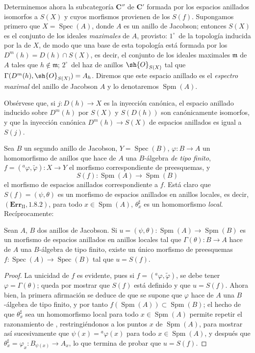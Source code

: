 \begin{env}[10.9.3]
\label{IV.10.9.3}
Determinemos ahora la subcategoría $\boldsymbol{C}''$ de $\boldsymbol{C}'$ formada por los espacios anillados isomorfos a $S(X)$ y cuyos morfismos provienen de los $S(f)$.
Supongamos primero que $X=\operatorname{Spec}(A)$, donde $A$ es un anillo de Jacobson; entonces $S(X)$ es el conjunto de los ideales \emph{maximales} de $A$, provisto: $1^\circ$~de la topología inducida por la de $X$, de modo que una base de esta topología está formada por los $D^m(h)=D(h)\cap S(X)$, es decir, el conjunto de los ideales maximales $\mathfrak{m}$ de $A$ tales que $h\notin\mathfrak{m}$; $2^\circ$~del haz de anillos $\sh{O}_{S(X)}$ tal que $\Gamma(D^m(h),\sh{O}_{S(X)})=A_h$.
Diremos que este espacio anillado es el \emph{espectro maximal} del anillo de Jacobson $A$ y lo denotaremos $\operatorname{Spm}(A)$.

Obsérvese que, si $j:D(h)\to X$ es la inyección canónica, el espacio anillado inducido sobre $D^m(h)$ por $S(X)$ y $S(D(h))$ son canónicamente isomorfos, y que la inyección canónica $D^m(h)\to S(X)$ de espacios anillados es igual a $S(j)$.

Sea $B$ un segundo anillo de Jacobson, $Y=\operatorname{Spec}(B)$, $\varphi:B\to A$ un homomorfismo de anillos que hace de $A$ una $B$-álgebra \emph{de tipo finito}, $f=({}^a\varphi,\widetilde{\varphi}):X\to Y$ el morfismo correspondiente de preesquemas, y
\[
  S(f):\operatorname{Spm}(A)\to\operatorname{Spm}(B)
\]
el morfismo de espacios anillados correspondiente a $f$.
Está claro que $S(f)=(\psi,\theta)$ es un morfismo de espacios anillados en anillos locales, es decir, $(\mathbf{Err}_{\mathrm{II}},1.8.2)$, para todo $x\in\operatorname{Spm}(A)$, $\theta^\sharp_x$ es un homomorfismo \emph{local}.
Recíprocamente:
\end{env}

\begin{proposition}[10.9.4]
\label{IV.10.9.4}
Sean $A$, $B$ dos anillos de Jacobson.
Si $u=(\psi,\theta):\operatorname{Spm}(A)\to\operatorname{Spm}(B)$ es un morfismo de espacios anillados en anillos locales tal que $\Gamma(\theta):B\to A$ hace de $A$ una $B$-álgebra de tipo finito, existe un único morfismo de preesquemas $f:\operatorname{Spec}(A)\to\operatorname{Spec}(B)$ tal que $u=S(f)$.
\end{proposition}

\begin{proof}
La unicidad de $f$ es evidente, pues si $f=({}^a\varphi,\widetilde{\varphi})$, se debe tener $\varphi=\Gamma(\theta)$; queda por mostrar que $S(f)$ está definido y que $u=S(f)$.
Ahora bien, la primera afirmación se deduce de que se supone que $\varphi$ hace de $A$ una $B$-álgebra de tipo finito, y por tanto $f(\operatorname{Spm}(A))\subset\operatorname{Spm}(B)$; el hecho de que $\theta^\sharp_x$ sea un homomorfismo local para todo $x\in\operatorname{Spm}(A)$ permite repetir el razonamiento de , restringiéndonos a los puntos $x$ de $\operatorname{Spm}(A)$, para mostrar así sucesivamente que $\psi(x)={}^a\varphi(x)$ para todo $x\in\operatorname{Spm}(A)$, y después que $\theta^\sharp_x=\varphi_x:B_{\psi(x)}\to A_x$, lo que termina de probar que $u=S(f)$.
\end{proof}

